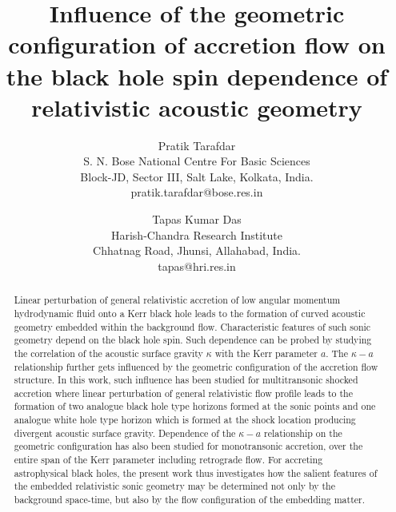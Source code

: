 \documentclass[10pt,authoryear]{article}
\begin{document}
\title{Influence of the geometric configuration of accretion flow on the black hole spin dependence of relativistic acoustic geometry}


\author{Pratik Tarafdar\\
	S. N. Bose National Centre For Basic Sciences\\ 
	Block-JD, Sector III, Salt Lake, Kolkata, India.\\
	pratik.tarafdar@bose.res.in
	\and
	Tapas Kumar Das\\
	Harish-Chandra Research Institute\\
	Chhatnag Road, Jhunsi, Allahabad, India.\\
	tapas@hri.res.in}
\date{}

\maketitle

\begin{abstract}
\noindent
Linear perturbation of general relativistic accretion of low angular momentum hydrodynamic fluid onto a Kerr black hole leads to the formation 
of curved acoustic geometry embedded within the background flow. Characteristic features of such sonic geometry depend on the black hole spin. 
Such dependence can be probed by studying the correlation of the acoustic surface gravity $\kappa$ with the Kerr parameter $a$. The $\kappa - a$ 
relationship further gets influenced by the geometric configuration of the accretion flow structure. In this work, such influence has been studied 
for multitransonic shocked accretion where linear perturbation of general relativistic flow profile leads to the formation of two analogue 
black hole type horizons formed at the sonic points and one analogue white hole type horizon which is formed at the shock location producing 
divergent acoustic surface gravity. Dependence of the $\kappa - a$ relationship on the geometric configuration has also been studied for 
monotransonic accretion, over the entire span of the Kerr parameter including retrograde flow. For accreting astrophysical black holes, 
the present work thus investigates how the salient features of the embedded relativistic sonic geometry may be determined not only by 
the background space-time, but also by the flow configuration of the embedding matter.
\end{abstract}
\end{document}
